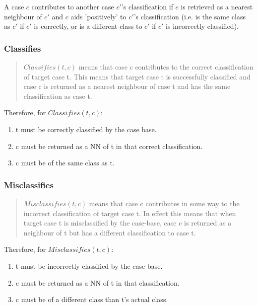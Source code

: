 \documentclass[a4paper,11pt]{report}
\begin{document}
A case $c$ contributes to another case $c\prime$'s classification if $c$ is retrieved as a nearest neighbour of $c\prime$ and $c$ aids 'positively' to $c\prime$'s classification (i.e. is the same class as $c\prime$ if $c\prime$ is correctly, or is a different class to  $c\prime$ if  $c\prime$ is incorrectly classified).
\subsubsection{Classifies}
\begin{quote}
$ Classifies(t, c) $ means that case c contributes to the correct classification of target case t. This means that target case t is successfully classified and case c is returned as a nearest neighbour of case t and has the same classification as case t.\cite{Delany2009}
\end{quote}

Therefore, for $ Classifies(t, c) $:
\begin{enumerate}
	\item t must be correctly classified by the case base.
	\item c must be returned as a NN of t in that correct classification.
	\item c must be of the same class as t.
\end{enumerate}

\subsubsection{Misclassifies}

\begin{quote}
$ Misclassifies(t, c ) $ means that case c contributes in some way to the incorrect classification of target case t. In effect this means that when target case t is misclassified by the case-base, case c is returned as a neighbour of t but has a different classification to case t.\cite{Delany2009}
\end{quote}


Therefore, for $ Misclassifies(t, c) $:
\begin{enumerate}
	\item t must be incorrectly classified by the case base.
	\item c must be returned as a NN of t in that classification.
	\item c must be of a different class than t's actual class.
\end{enumerate}
\end{document}
